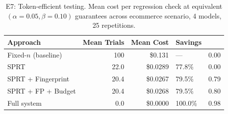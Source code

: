 \begin{table}[t]
\centering
\caption{E7: Token-efficient testing. Mean cost per regression check at
  equivalent $(\alpha = 0.05, \beta = 0.10)$ guarantees across
  ecommerce scenario, 4 models, 25 repetitions.}
\label{tab:e7-efficiency}
\small
\begin{tabular}{lrrl}
\toprule
\textbf{Approach} & \textbf{Mean Trials} & \textbf{Mean Cost} &
  \textbf{Savings} \\
\midrule
    Fixed-$n$ (baseline) & 100 & \$0.131 & --- & 0.00 \\
    SPRT & 22.0 & \$0.0289 & 77.8\% & 0.00 \\
    SPRT + Fingerprint & 20.4 & \$0.0267 & 79.5\% & 0.79 \\
    SPRT + FP + Budget & 20.4 & \$0.0268 & 79.5\% & 0.80 \\
    Full system & 0.0 & \$0.0000 & 100.0\% & 0.98 \\
\bottomrule
\end{tabular}
\end{table}